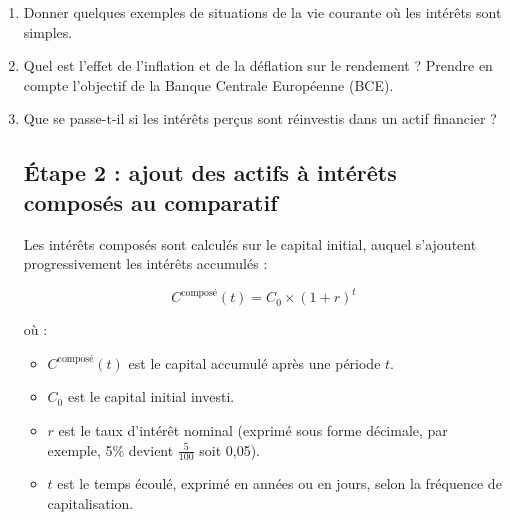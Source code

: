 \documentclass{article}
\begin{document}
\begin{enumerate}[label=\textbf{Q1.\arabic*}]
    \item Donner quelques exemples de situations de la vie courante où les intérêts sont simples.
          
    \item Quel est l'effet de l'inflation et de la déflation sur le rendement ? Prendre en compte l'objectif de la Banque Centrale Européenne (BCE).
          
    \item Que se passe-t-il si les intérêts perçus sont réinvestis dans un actif financier ?
          
          
          \subsection*{Étape 2 : ajout des actifs à intérêts composés au comparatif}
          \begin{tcolorbox}[
                  colback=lightgreen, 
                  colframe=lightgreen, 
                  boxrule=0.5pt, 
                  arc=0pt, 
                  left=10pt, 
                  right=10pt, 
                  top=6pt, 
                  bottom=6pt, 
                  boxsep=2pt, 
                  before upper={\faLightbulb\hspace{10pt}}
              ]
              Les intérêts composés sont calculés sur le capital initial, auquel s'ajoutent progressivement les intérêts accumulés :
                  
              
              \[
                  C^{\text{composé}}(t) = C_0 \times (1 + r)^t
              \]
                  
              où :
              \begin{itemize}
                  \item \( C^{\text{composé}}(t) \) est le capital accumulé après une période \( t \).
                  \item \( C_0 \) est le capital initial investi.
                  \item \( r \) est le taux d'intérêt nominal (exprimé sous forme décimale, par exemple, 5\% devient $\frac{5}{100}$ soit 0,05).
                  \item \( t \) est le temps écoulé, exprimé en années ou en jours, selon la fréquence de capitalisation.
              \end{itemize}
          \end{tcolorbox}
          

\end{enumerate}
\end{document}
